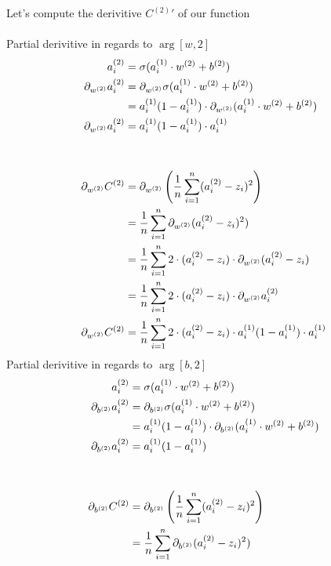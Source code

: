 \documentclass{article}
\begin{document}
Let's compute the derivitive $C^{(2)}$$'$ of our function\\
\\
\indent Partial derivitive in regards to $\arg[w, 2]$
\begin{align}
    a_i^{(2)} &= \sigma(a_i^{(1)} \cdot \arg[w, 2] + \arg[b, 2])\\
    \pd[{\arg[w, 2]}]a_i^{(2)} 
        &= \pd[{\arg[w, 2]}]\sigma(a_i^{(1)} \cdot \arg[w, 2] + \arg[b, 2])\\
        &= a_i^{(1)}(1 - a_i^{(1)}) \cdot \pd[{\arg[w, 2]}](a_i^{(1)} \cdot \arg[w, 2] + \arg[b, 2])\\
    \pd[{\arg[w, 2]}]a_i^{(2)} &= a_i^{(1)}(1 - a_i^{(1)}) \cdot a_i^{(1)}\\
    \\
    \\
    \pd[{\arg[w, 2]}]C^{(2)} 
                &=  \pd[{\arg[w, 2]}]\left(\avgsum[i, n](a_i^{(2)} - z_i)^2\right)    \\
                &=  \avgsum[i, n]\pd[{\arg[w, 2]}](a_i^{(2)} - z_i)^2)    \\
                &=  \avgsum[i, n]2 \cdot (a_i^{(2)} - z_i) \cdot \pd[{\arg[w, 2]}](a_i^{(2)} - z_i)    \\
                &=  \avgsum[i, n]2 \cdot (a_i^{(2)} - z_i) \cdot \pd[{\arg[w, 2]}]a_i^{(2)}    \\
    \pd[{\arg[w, 2]}]C^{(2)}  &=  \avgsum[i, n]2 \cdot (a_i^{(2)} - z_i) \cdot a_i^{(1)}(1 - a_i^{(1)}) \cdot a_i^{(1)}    \\
\end{align}
\indent Partial derivitive in regards to $\arg[b, 2]$
\begin{align}
    a_i^{(2)} &= \sigma(a_i^{(1)} \cdot \arg[w, 2] + \arg[b, 2])\\
    \pd[{\arg[b, 2]}]a_i^{(2)} 
        &= \pd[{\arg[b, 2]}]\sigma(a_i^{(1)} \cdot \arg[w, 2] + \arg[b, 2])\\
        &= a_i^{(1)}(1 - a_i^{(1)}) \cdot \pd[{\arg[b, 2]}](a_i^{(1)} \cdot \arg[w, 2] + {\arg[b, 2]})\\
    \pd[{\arg[b, 2]}]a_i^{(2)}   &= a_i^{(1)}(1 - a_i^{(1)}) \\
    \\
    \\
    \pd[{\arg[b, 2]}]C^{(2)}
                &=  \pd[{\arg[b, 2]}]\left(\avgsum[i, n](a_i^{(2)} - z_i)^2\right)    \\
                &=  \avgsum[i, n]\pd[{\arg[b, 2]}](a_i^{(2)} - z_i)^2)    \\

\end{align}$$
\end{document}
